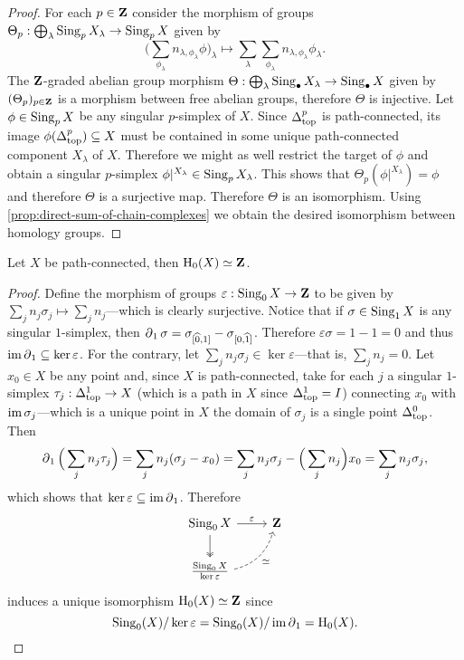 \begin{proof}
For each \(p \in \mathbf{Z}\) consider the morphism of groups
\(\Theta_p: \bigoplus_{\lambda} \operatorname{Sing}_p X_{\lambda} \to \operatorname{Sing}_p X\) given by
\[
\Big( \sum_{\phi_{\lambda}} n_{\lambda, \phi_{\lambda}} \phi \Big)_{\lambda}
\longmapsto
\sum_{\lambda} \sum_{\phi_{\lambda}} n_{\lambda, \phi_{\lambda}} \phi_{\lambda}.
\]
The \(\mathbf{Z}\)-graded abelian group morphism
\(\Theta: \bigoplus_{\lambda} \operatorname{Sing}_{\bullet} X_{\lambda} \to \operatorname{Sing}_{\bullet}
X\) given by \((\Theta_p)_{p \in \mathbf{Z}}\) is a morphism between free abelian
groups, therefore \(\Theta\) is injective. Let \(\phi \in \operatorname{Sing}_p X\) be any
singular \(p\)-simplex of \(X\). Since \(\Delta_{\text{top}}^p\) is path-connected, its
image \(\phi(\Delta_{\text{top}}^p) \subseteq X\) must be contained in some unique
path-connected component \(X_{\lambda}\) of \(X\). Therefore we might as well
restrict the target of \(\phi\) and obtain a singular \(p\)-simplex
\(\phi|^{X_{\lambda}} \in \operatorname{Sing}_p X_{\lambda}\). This shows that \(\Theta_p(\phi|^{X_{\lambda}}) = \phi\) and
therefore \(\Theta\) is a surjective map. Therefore \(\Theta\) is an isomorphism. Using
\cref{prop:direct-sum-of-chain-complexes} we obtain the desired isomorphism
between homology groups.
\end{proof}

\begin{proposition}
\label{prop:path-connected-homology0-is-Z}
Let \(X\) be path-connected, then \(\operatorname{H}_0(X) \simeq \mathbf{Z}\).
\end{proposition}

\begin{proof}
Define the morphism of groups \(\varepsilon: \operatorname{Sing}_0 X \to \mathbf{Z}\) to be given by
\(\sum_j n_j \sigma_j \mapsto \sum_j n_j\)---which is clearly surjective. Notice
that if \(\sigma \in \operatorname{Sing}_1 X\) is any singular \(1\)-simplex, then
\(\operatorname{\partial}_1 \sigma = \sigma_{[\widehat 0, 1]} - \sigma_{[0, \widehat
  1]}\). Therefore \(\varepsilon \sigma = 1 - 1 = 0\) and thus
\(\operatorname{im} \operatorname{\partial}_1 \subseteq \ker \varepsilon\). For the contrary, let
\(\sum_j n_j \sigma_j \in \ker \varepsilon\)---that is, \(\sum_j n_j = 0\). Let
\(x_0 \in X\) be any point and, since \(X\) is path-connected, take for each
\(j\) a singular \(1\)-simplex \(\tau_j: \Delta_{\text{top}}^1 \to X\) (which is a path in
\(X\) since \(\Delta_{\text{top}}^1 = I\)) connecting \(x_0\) with \(\operatorname{im} \sigma_j\)---which
is a unique point in \(X\) the domain of \(\sigma_j\) is a single point
\(\Delta_{\text{top}}^0\). Then
\[
\operatorname{\partial}_1 \Big( \sum_j n_j \tau_j \Big) = \sum_j n_j (\sigma_j - x_0)
= \sum_j n_j \sigma_j - \Big(\sum_j n_j\Big) x_0
= \sum_j n_j \sigma_j,
\]
which shows that \(\ker \varepsilon \subseteq \operatorname{im} \operatorname{\partial}_1\). Therefore
\[
\begin{tikzcd}
\Sing_0 X \ar[r, "\varepsilon"] \ar[d, two heads]
&\Z \\
\frac{\Sing_0 X}{\ker \varepsilon}
\ar[ru, dashed, "\dis"', bend right] &
\end{tikzcd}
\]
induces a unique isomorphism \(\operatorname{H}_0(X) \simeq \mathbf{Z}\) since
\[
\operatorname{Sing}_0(X)/\ker\varepsilon = \operatorname{Sing}_0(X)/\operatorname{im} \operatorname{\partial}_1 = \operatorname{H}_0(X).
\]
\end{proof}

